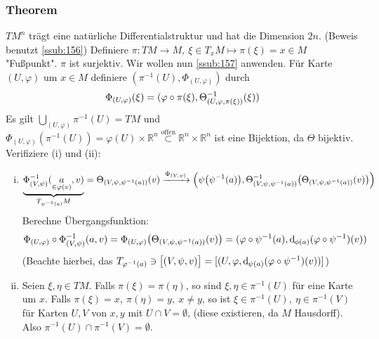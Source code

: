 \subsubsection{Theorem}
\label{ssub:133}
$TM^n$ trägt eine natürliche Differentialstruktur und hat die Dimension $2n$. (Beweis benutzt \ref{ssub:156})
Definiere $\pi: TM\to M,\ \xi \in T_x M \mapsto \pi(\xi) = x\in M$ "Fußpunkt". $\pi$ ist surjektiv. Wir wollen nun \ref{ssub:157} anwenden. Für Karte $(U,\varphi)$ um $x\in M$ definiere $(\pi^{-1}(U),\Phi_{(U,\varphi)})$ durch 
\[
\Phi_{(U,\varphi)} (\xi) = (\varphi \circ \pi(\xi),\Theta^{-1}_{(U,\varphi,\pi(\xi))}(\xi))
\]
Es gilt $\bigcup_{(U,\varphi)} \pi^{-1}(U) = TM$ und $\Phi_{(U,\varphi)}(\pi^{-1}(U)) = \varphi(U)\times \mathds{R}^n \overset{\text{offen}}{\subset} \mathds{R}^n\times \mathds{R}^n$ ist eine Bijektion, da $\Theta$ bijektiv.\\
Verifiziere (i) und (ii):
\begin{enumerate}[(i)]
\item 
\[
\underbrace{\Phi_{(V,\psi)}^{-1}(\underset{\in \varphi(v)}{a},v)}_{T_{\psi^{-1}(a)} M} = \Theta_{(V,\psi,\psi ^{-1}(a))} (v) \xrightarrow{\Phi_{(V,\psi)}} \enbrace*{\psi\enbrace*{\psi^{-1}(a)}, \Theta^{-1}_{(V,\psi,\psi ^{-1}(a))}\enbrace*{\Theta_{(V,\psi,\psi ^{-1}(a))}(v)}}
\]
Berechne Übergangsfunktion:
\[
\Phi_{(U,\varphi)} \circ \Phi_{(V,\psi)}^{-1} (a,v) = \Phi_{(U,\varphi)}\enbrace*{\Theta_{(V,\psi,\psi ^{-1}(a))} (v)} = \enbrace{\varphi \circ \psi^{-1} (a), \mathd_{\phi(a)}(\varphi \circ \psi^{-1})(v)}
\]
(Beachte hierbei, das $T_{\varphi^{-1}(a)} \ni \big[(V,\psi,v)\big] = [(U,\varphi,\mathrm{d}\mkern-1.0mu_{\psi(a)}(\varphi \circ \psi^{-1})(v))]$)
\item Seien $\xi,\eta \in TM$. Falls $\pi(\xi) = \pi(\eta)$, so sind $\xi,\eta \in \pi^{-1}(U)$ für eine Karte um $x$. Falls $\pi(\xi) = x,\ \pi(\eta) = y,\ x\neq y$, so ist $\xi \in \pi^{-1}(U),\ \eta \in \pi^{-1}(V)$ für Karten $U,V$ von $x, y$ mit $U\cap V = \emptyset$, (diese existieren, da $M$ Hausdorff). Also $\pi^{-1}(U)\cap \pi^{-1}(V) = \emptyset$.
\end{enumerate}

